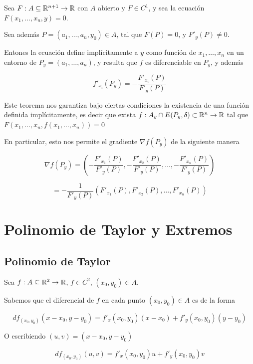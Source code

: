\begin{theorem} \label{cauchy_dini} 
Sea $F : A \subseteq \mathbb{R}^{n+1} \to \mathbb{R}$ con $A$ abierto y $F \in C^1$, y sea la ecuación $F(x_1, \ldots, x_n, y) = 0$.

Sea además $P=(a_1, \ldots, a_n, y_0) \in A$, tal que $F(P) = 0$, y $ F'_y(P) \neq 0$.  

Entones la ecuación define implícitamente a $y$ como función de $x_1, \ldots, x_n$ en un entorno de $P_y = (a_1, \ldots, a_n)$, y resulta que $ f $ es diferenciable en $P_y$, y además

$$ f'_{x_i}(P_y) = - \frac{F'_{x_i}(P)}{F'_y(P)} $$
\end{theorem}

Este teorema nos garantiza bajo ciertas condiciones la existencia de una función definida implícitamente, es decir que exista $ f : A_y \cap E(P_y, \delta) \subset \mathbb{R}^n \to \mathbb{R}$ tal que $F(x_1, \ldots, x_n, f(x_1, \ldots, x_n)) = 0$

En particular, esto nos permite el gradiente $ \nabla f(P_y)$ de la siguiente manera

$$ \nabla f(P_y) = \left( - \frac{F'_{x_1}(P)}{F'_y(P)}, - \frac{F'_{x_2}(P)}{F'_y(P)}, \ldots, - \frac{F'_{x_n}(P)}{F'_y(P)} \right) $$

$$ = - \frac{1}{F'_y(P)} \left( F'_{x_1}(P), F'_{x_2}(P), \ldots, F'_{x_n}(P) \right) $$


\chapter{Polinomio de Taylor y Extremos}

\section{Polinomio de Taylor}

Sea $f: A \subseteq \mathbb{R}^2 \to \mathbb{R}$, $f \in C^2$, $(x_0, y_0) \in A$.

Sabemos que el diferencial de $f$ en cada punto $(x_0, y_0) \in A$ es de la forma

$$ df_{(x_0,y_0)}(x-x_0, y-y_0) = f'_x(x_0,y_0) (x-x_0) + f'_y(x_0,y_0) (y-y_0) $$

O escribiendo $(u,v) = (x-x_0, y-y_0)$

$$ df_{(x_0,y_0)}(u,v) = f'_x(x_0,y_0)u + f'_y(x_0,y_0)v $$


